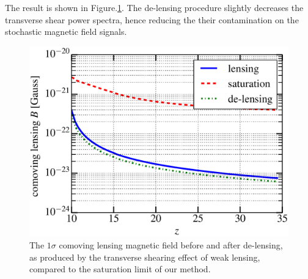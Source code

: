 \documentclass[aps,prd,twocolumn,floatfix,showpacs,superscriptaddress,nofootinbib]{revtex4-1}
\begin{document}
The result is shown in Figure.\ref{fig:ps_B}. The de-lensing procedure slightly decreases the transverse shear power spectra, hence reducing the their contamination on the stochastic magnetic field signals.

\begin{figure}[h]
\centering
\includegraphics[scale=0.35]{delensingB.eps}
\caption{The $1\sigma$ comoving lensing magnetic field before and after de-lensing, as produced by the transverse shearing effect of weak lensing, compared to the saturation limit of our method.}
\label{fig:ps_B}
\end{figure}
\end{document}
